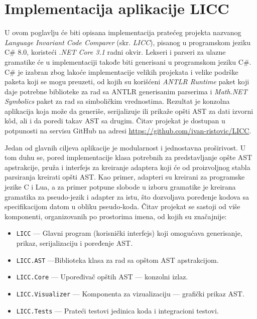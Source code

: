 \chapter{Implementacija aplikacije LICC}
\label{chp:Implementation}

U ovom poglavlju će biti opisana implementacija pratećeg projekta nazvanog \emph{Language Invariant Code Comparer} (skr. \emph{LICC}), pisanog u programskom jeziku C\# 8.0, koristeći \emph{.NET Core 3.1} radni okvir. Lekseri i parseri za ulazne gramatike će u implementaciji takođe biti generisani u programskom jeziku C\#. C\# je izabran zbog lakoće implementacije velikih projekata i velike podrške paketa koji se mogu preuzeti, od kojih su korišćeni \emph{ANTLR Runtime} paket koji daje potrebne biblioteke za rad sa ANTLR generisanim parserima i \emph{Math.NET Symbolics} paket za rad sa simboličkim vrednostima. Rezultat je konzolna aplikacija koja može da generiše, serijalizuje ili prikaže opšti AST za dati izvorni k\^od, ali i da poredi takav AST sa drugim. Čitav projekat je dostupan u potpunosti na servisu GitHub na adresi \url{https://github.com/ivan-ristovic/LICC}.

Jedan od glavnih ciljeva aplikacije je modularnost i jednostavna proširivost. U tom duhu se, pored implementacije klasa potrebnih za predstavljanje opšte AST apstrakcije, pruža i interfejs za kreiranje adaptera koji će od proizvoljnog stabla parsiranja kreirati opšti AST. Kao primer, adapteri su kreirani za programske jezike C i Lua, a za primer potpune slobode u izboru gramatike je kreirana gramatika za pseudo-jezik i adapter za istu, što dozvoljava poređenje kodova sa specifikacijom datom u obliku pseudo-koda. Čitav projekat se sastoji od više komponenti, organizovanih po prostorima imena, od kojih su značajnije:
\begin{itemize}
    \item \texttt{LICC} --- Glavni program (korisnički interfejs) koji omogućava generisanje, prikaz, serijalizaciju i poređenje AST.
    \item \texttt{LICC.AST} ---Biblioteka klasa za rad sa opštom AST apstrakcijom.
    \item \texttt{LICC.Core} --- Upoređivač opštih AST --- konzolni izlaz.
    \item \texttt{LICC.Visualizer} --- Komponenta za vizualizaciju --- grafički prikaz AST.
    \item \texttt{LICC.Tests} --- Prateći testovi jedinica koda i integracioni testovi.
\end{itemize}

